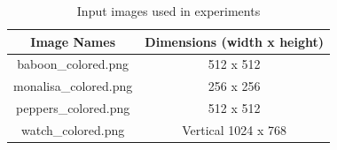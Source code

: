 \documentclass[]{IEEEtran}
\begin{document}
\begin{table}[h!]
\centering
\begin{center}
\begin{tabular}{ |c|c| } 
 \hline
 Image Names & Dimensions (width x height) \\
 \hline
  baboon\_colored.png &  512 x 512\\ 
 \hline
  monalisa\_colored.png & 256 x 256\\
 \hline
  peppers\_colored.png &  512 x 512\\ 
 \hline
  watch\_colored.png & Vertical 1024 x 768\\
 \hline
\end{tabular}
\caption{Input images used in experiments}
\label{table:input}
\end{center}
\end{table}
\end{document}
